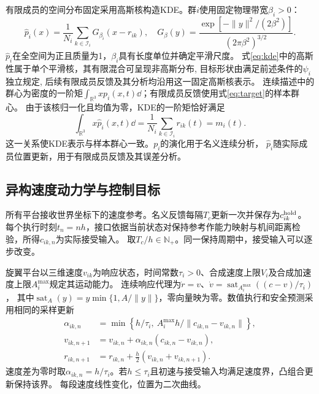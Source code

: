 \documentclass[UTF8,a4paper,11pt,fontset=none]{ctexart}
\newcommand{\R}{\mathbb R}\newcommand{\KL}{\operatorname{KL}}
\begin{document}
有限成员的空间分布固定采用高斯核构造KDE。群$i$使用固定物理带宽$\beta_i>0$：
\begin{equation}
\widehat p_i(x)=\frac1{N_i}\sum_{k\in\mathcal I_i}G_{\beta_i}(x-r_{ik}),\quad
G_\beta(y)=\frac{\exp[-\|y\|^2/(2\beta^2)]}{(2\pi\beta^2)^{3/2}}.
\label{eq:kde}
\end{equation}
$\widehat p_i$在全空间为正且质量为1，$\beta_i$具有长度单位并确定平滑尺度。
式\eqref{eq:kde}中的高斯性属于单个平滑核，其有限混合可呈现非高斯分布,
目标形状由满足前述条件的$\psi_i$独立规定,
后续有限成员反馈及其分析均沿用这一固定高斯核表示。
连续描述中的群心为密度的一阶矩$\int_{\R^3}xp_i(x,t)\dd$；有限成员反馈使用式\eqref{eq:target}的样本群心。
由于该核归一化且均值为零，KDE的一阶矩恰好满足
\[
\int_{\R^3}x\widehat p_i(x,t)\dd
=\frac1{N_i}\sum_{k\in\mathcal I_i}r_{ik}(t)=m_i(t).
\]
这一关系使KDE表示与样本群心一致。$p_i$的演化用于名义连续分析，
$\widehat p_i$随实际成员位置更新，用于有限成员反馈及其误差分析。

\subsection{异构速度动力学与控制目标}
所有平台接收世界坐标下的速度参考。名义反馈每隔$T_c$更新一次并保存为$c^{\rm hold}_{ik}$。
每个执行时刻$t_n=nh$，接口依据当前状态对保持参考作能力映射与机间距离检验，所得$c_{ik,n}$为实际接受输入。
取$T_c/h\in\mathbb N_+$。同一保持周期中，接受输入可以逐步改变。

旋翼平台以三维速度$v_{ik}$为响应状态，时间常数$\tau_i>0$、合成速度上限$V_i$及合成加速度上限$A_i^{\max}$规定其运动能力。
连续响应代理为$\dot r=v$、$\dot v=\operatorname{sat}_{A_i^{\max}}((c-v)/\tau_i)$，
其中$\operatorname{sat}_A(y)=y\min\{1,A/\|y\|\}$，零向量映为零。数值执行和安全预测采用相同的采样更新
\begin{equation}
\begin{aligned}
\alpha_{ik,n}&=\min\left\{h/\tau_i,\ A_i^{\max}h/\|c_{ik,n}-v_{ik,n}\|\right\},\\
v_{ik,n+1}&=v_{ik,n}+\alpha_{ik,n}(c_{ik,n}-v_{ik,n}),\\
r_{ik,n+1}&=r_{ik,n}+\tfrac h2(v_{ik,n}+v_{ik,n+1}).
\end{aligned}
\label{eq:step}
\end{equation}
速度差为零时取$\alpha_{ik,n}=h/\tau_i$。若$h\le\tau_i$且初速与接受输入均满足速度界，凸组合更新保持该界。
每段速度线性变化，位置为二次曲线。
\end{document}
